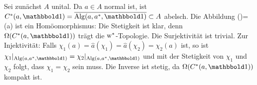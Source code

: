 \begin{beweis}
	Sei zunächst $A$ unital. Da $a \in A$ normal ist, ist $C^*(a,\ind) = \overline{\Alg(a,a^*,\ind)} \subset A$ abelsch. Die Abbildung
	{\chi}{(\chi)=\chi(a)}{}
	ist ein Homöomorphismus: Die Stetigkeit ist klar, denn $\Omega \enbrace*{C^*(a,\ind)}$ trägt die $\mathrm{w}^*$-Topologie. 
	Die Surjektivität ist trivial. 
	Zur Injektivität: Falls $\chi_1(a)= \widehat{a}(\chi_1) = \widehat{a}(\chi_2) = \chi_2(a)$ ist, so ist $\chi_1|_{\Alg(a,a^*,\ind)} = \chi_2|_{\Alg(a,a^*,\ind)}$ und mit der Stetigkeit von $\chi_1$ und $\chi_2$ folgt, dass $\chi_1=\chi_2$ sein muss.
	Die Inverse ist stetig, da $\Omega \enbrace*{C^*(a,\ind)}$ kompakt ist.
	

\end{beweis}
